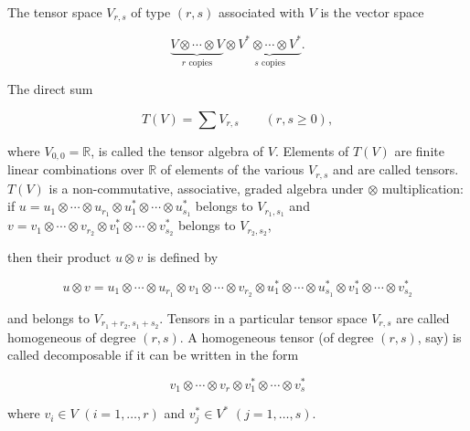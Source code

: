 \begin{definition}\label{thm:2.3}
The tensor space $V_{r,s}$ of type $(r,s)$ associated with $V$ is the vector space


\[
\underbrace{V\otimes\cdots\otimes V}_{r\text{ copies}}\otimes\underbrace{V^{*}\otimes\cdots\otimes V^{*}}_{s\text{ copies}}.
\]

The direct sum


\[
T(V)=\sum V_{r,s}\qquad(r,s\geq0),
\]

where  $ V_{0,0} = \mathbb{R} $, is called the tensor algebra of  $ V $. Elements of  $ T(V) $ are finite linear combinations over  $ \mathbb{R} $ of elements of the various  $ V_{r,s} $ and are called tensors.  $ T(V) $ is a non-commutative, associative, graded algebra under  $ \otimes $ multiplication: if  $ u = u_1 \otimes \cdots \otimes u_{r_1} \otimes u_1^* \otimes \cdots \otimes u_{s_1}^* $ belongs to  $ V_{r_1,s_1} $ and  $ v = v_1 \otimes \cdots \otimes v_{r_2} \otimes v_1^* \otimes \cdots \otimes v_{s_2}^* $ belongs to $V_{r_2,s_2}$, 




then their product  $ u \otimes v $ is defined by

\[
u\otimes v=u_{1}\otimes\cdots\otimes u_{r_{1}}\otimes v_{1}\otimes\cdots\otimes v_{r_{2}}\otimes u_{1}^{*}\otimes\cdots\otimes u_{s_{1}}^{*}\otimes v_{1}^{*}\otimes\cdots\otimes v_{s_{2}}^{*}
\]

and belongs to $V_{r_{1}+r_{2},s_{1}+s_{2}}$. Tensors in a particular tensor space $V_{r,s}$ are called homogeneous of degree $(r,s)$. A homogeneous tensor (of degree $(r,s)$, say) is called decomposable if it can be written in the form

\[
v_{1}\otimes\cdots\otimes v_{r}\otimes v_{1}^{*}\otimes\cdots\otimes v_{s}^{*}
\]

where  $ v_i \in V $  $ (i = 1, \ldots, r) $ and  $ v_j^* \in V^* $  $ (j = 1, \ldots, s) $.
\end{definition}

